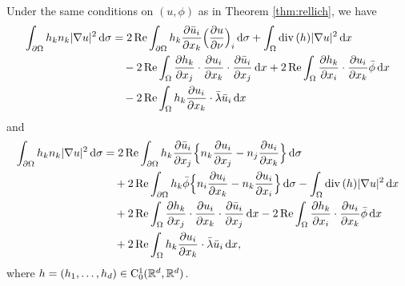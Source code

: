 \begin{lem}
  \label{lem:rellichIdentity}
  Under the same conditions on $(u,\phi)$ as in Theorem \ref{thm:rellich}, we have
  \begin{align}
    \int_{\partial\Omega} h_k n_k |\nabla u|^2 \, {\operatorname{d}\!{\sigma}} 
    &= 2 \operatorname{Re} \int_{\partial\Omega} h_k \frac{\partial \bar u_i}{\partial x_k} \Big( \frac{\partial u}{\partial \nu} \Big)_i \, {\operatorname{d}\!{\sigma}} + \int_\Omega \mathrm{div\,} (h) |\nabla u|^2 \, {\operatorname{d}\!{x}} \nonumber\\
    &\quad - 2 \operatorname{Re} \int_\Omega \frac{\partial h_k}{\partial x_j} \cdot \frac{\partial u_i}{\partial x_k} \cdot \frac{\partial \bar u_i}{\partial x_j} \, {\operatorname{d}\!{x}} + 2 \operatorname{Re} \int_\Omega \frac{\partial h_k}{\partial x_i} \cdot \frac{\partial u_i}{\partial x_k} \bar \phi \, {\operatorname{d}\!{x}} \nonumber\\
    &\quad - 2 \operatorname{Re} \int_\Omega h_k \frac{\partial u_i}{\partial x_k} \cdot \bar \lambda \bar u_i \, {\operatorname{d}\!{x}} \label{eq:rellichIdentity}
  \end{align}
  and
  \begin{align}
    \int_{\partial\Omega} h_k n_k |\nabla u|^2 \, {\operatorname{d}\!{\sigma}}
    &= 2\operatorname{Re} \int_{\partial\Omega} h_k \frac{\partial \bar u_i}{\partial x_j} \Big\{ n_k \frac{\partial u_i}{\partial x_j} - n_j \frac{\partial u_i}{\partial x_k} \Big\} \, {\operatorname{d}\!{\sigma}} \nonumber\\
    &\quad + 2 \operatorname{Re} \int_{\partial\Omega} h_k \bar \phi \Big\{ n_i \frac{\partial u_i}{\partial x_k} - n_k \frac{\partial u_i}{\partial x_i} \Big\} \, {\operatorname{d}\!{\sigma}} - \int_\Omega \mathrm{div\,} (h) |\nabla u|^2 \, {\operatorname{d}\!{x}} \nonumber\\
    &\quad + 2 \operatorname{Re} \int_\Omega \frac{\partial h_k}{\partial x_j} \cdot \frac{\partial u_i}{\partial x_k} \cdot \frac{\partial \bar u_i}{\partial x_j} \, {\operatorname{d}\!{x}} - 2 \operatorname{Re} \int_\Omega \frac{\partial h_k}{\partial x_i} \cdot \frac{\partial u_i}{\partial x_k} \bar \phi \, {\operatorname{d}\!{x}} \nonumber\\
    &\quad + 2 \operatorname{Re} \int_\Omega h_k \frac{\partial u_i}{\partial x_k} \cdot \bar \lambda \bar u_i \, {\operatorname{d}\!{x}}, \label{eq:rellichIdentity2}
  \end{align}
  where $h = (h_1, \dots,h_d) \in \mathrm{C}_0^1(\mathbb{R}^d, \mathbb{R}^d)$.
\end{lem}

